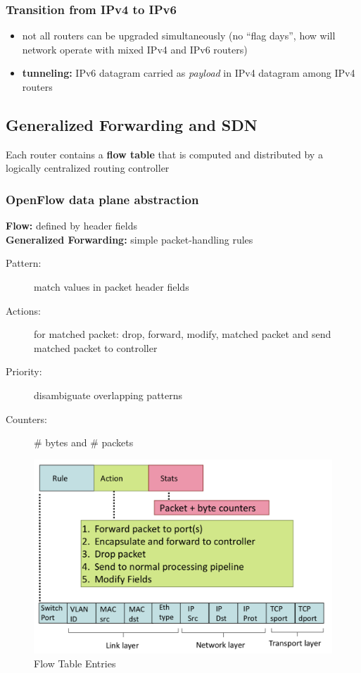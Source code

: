 \subsubsection{Transition from IPv4 to IPv6}
\begin{itemize}
	\item not all routers can be upgraded simultaneously (no ``flag days'', how will network operate with mixed IPv4 and IPv6 routers)
	\item \textbf{tunneling:} IPv6 datagram carried as \textit{payload} in IPv4 datagram among IPv4 routers
\end{itemize}

\subsection{Generalized Forwarding and SDN}
Each router contains a \textbf{flow table} that is computed and distributed by a logically centralized routing controller
\subsubsection{OpenFlow data plane abstraction}
\textbf{Flow:} defined by header fields\\
\textbf{Generalized Forwarding:} simple packet-handling rules
\begin{description}
	\item[Pattern:] match values in packet header fields
	\item[Actions:] for matched packet: drop, forward, modify, matched packet and send matched packet to controller
	\item[Priority:] disambiguate overlapping patterns
	\item[Counters:] \# bytes and \# packets
\end{description}
\begin{figure}[H]
	\includegraphics[width=\linewidth]{flow}
	\centering
	\caption{Flow Table Entries}
\end{figure}
